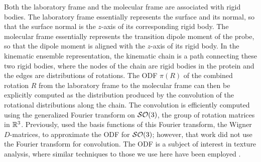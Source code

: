 \documentclass[../../main.tex]{subfiles}
\begin{document}
\begin{refsection}
	Both the laboratory frame and the molecular frame are associated with rigid bodies.
	The laboratory frame essentially represents the surface and its normal, so that the surface normal is the $z$-axis of its corresponding rigid body.
	The molecular frame essentially represents the transition dipole moment of the probe, so that the dipole moment is aligned with the $z$-axis of its rigid body.
	In the kinematic ensemble representation, the kinematic chain is a path connecting these two rigid bodies, where the nodes of the chain are rigid bodies in the protein and the edges are distributions of rotations.
	The ODF $\pi(R)$ of the combined rotation $R$ from the laboratory frame to the molecular frame can then be explicitly computed as the distribution produced by the convolution of the rotational distributions along the chain.
	The convolution is efficiently computed using the generalized Fourier transform on $\mathcal{SO} (3)$, the group of rotation matrices in $\mathbb{R}^3$.
	Previously, \cite{dickIrreducibleTensorAnalysis1985} used the basis functions of this Fourier transform, the Wigner $D$-matrices\supercite{wignerThreeDimensionalPureRotation1959,varshalovichQuantumTheoryAngular1988}, to approximate the ODF for $\mathcal{SO} (3)$; however, that work did not use the Fourier transform for convolution.
	The ODF is a subject of interest in texture analysis, where similar techniques to those we use here have been employed \supercite{schaebenSphericalHarmonicsTexture2003}.


\end{refsection}
\end{document}
